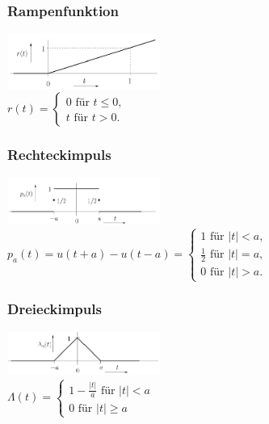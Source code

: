 \begin{multicols}{2}
  \subsubsection*{Rampenfunktion}
  \includegraphics[width=5cm]{include/Wichtige Funktionen/img/Rampenfunktion.png}
  \footnotesize
  \\ $r(t) = \begin{cases}
      0 \textrm{ für } t \leq 0, \\
      t \textrm{ für } t > 0.
    \end{cases}$                                                          \\
  \subsubsection*{Rechteckimpuls}
  \includegraphics[width=5cm]{include/Wichtige Funktionen/img/Rechteckimpuls.png}
  \footnotesize
  \\ $p_a(t) = u(t+a)-u(t-a)= \begin{cases}
      1 \textrm{ für } |t| < a,           \\
      \frac{1}{2} \textrm{ für } |t| = a, \\
      0 \textrm{ für } |t| > a.
    \end{cases} $                               \\
  \subsubsection*{Dreieckimpuls}
  \includegraphics[width=5cm]{include/Wichtige Funktionen/img/Dreieckimpuls.png}
  \footnotesize
  \\ $\Lambda(t) = \begin{cases}
      1 - \frac{|t|}{a} \textrm{ für } |t| < a \\
      0 \textrm{ für } |t| \geq a
    \end{cases}$                                      \\

\end{multicols}
